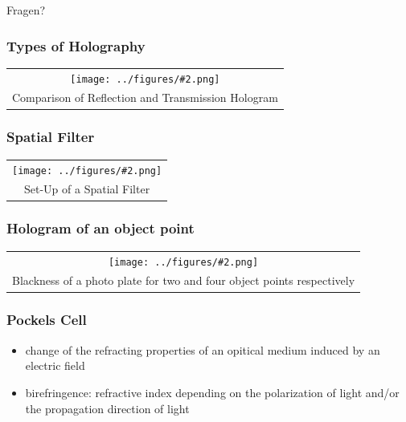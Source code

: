 \documentclass[10pt]{beamer}
\newcommand{\gra}[3][]{
	\begin{table}
	\centering
	\begin{tabular}[width=\textwidth]{c}
		\texttt{[image: ../figures/\#2.png]}\\
		\small #3
	\end{tabular}
	\end{table}
}
\newcommand{\degree}{^\circ}
\begin{document}
%				
%				

\begin{frame}
	\LARGE{Fragen?}
\end{frame}


\begin{frame}
	\frametitle{Types of Holography}
	\gra[0.5]{Reflex_Transmissions_Hologram}{Comparison of Reflection and Transmission Hologram  \footfullcite{staats}}
\end{frame}

\begin{frame}
	\frametitle{Spatial Filter}
	\gra[0.8]{SpatialFilter}{Set-Up of a Spatial Filter }
\end{frame}

\begin{frame}
	\frametitle{Hologram of an object point}
	\gra[0.5]{obj2}{Blackness of a photo plate for two and four object points respectively \footfullcite{staats}}
\end{frame}

\begin{frame}
	\frametitle{Pockels Cell}
	\begin{itemize}
	\item change of the refracting properties of an opitical medium induced by an electric field
	\item birefringence: refractive index depending on the polarization of light and/or the propagation direction of light
	\end{itemize}
\end{frame}
\end{document}
